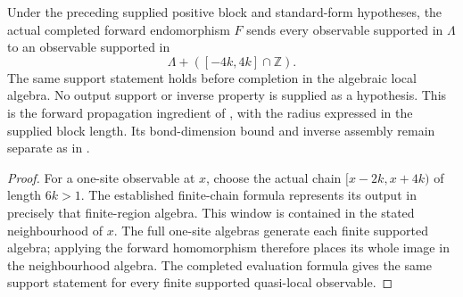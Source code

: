 \begin{lemma}
    \label{lem:mpu_finite_heisenberg_forward_propagation}
    \leanok
    Under the preceding supplied positive block and standard-form
    hypotheses, the actual completed forward endomorphism $F$ sends
    every observable supported in $\Lambda$ to an observable supported
    in
    \[
        \Lambda+([-4k,4k]\cap\mathbb Z).
    \]
    The same support statement holds before completion in the algebraic
    local algebra. No output support or inverse property is supplied
    as a hypothesis. This is the forward propagation ingredient of
    \cite[lines~2298--2306]{Cirac2017MPU}, with the radius expressed
    in the supplied block length. Its bond-dimension bound and inverse
    assembly remain separate as in
    \cite{gap:mpu_qca_complete_block_heisenberg_scope}.
\end{lemma}
\begin{proof}\leanok
    For a one-site observable at $x$, choose the actual chain
    $[x-2k,x+4k)$ of length $6k>1$. The established finite-chain
    formula represents its output in precisely that finite-region
    algebra. This window is contained in the stated neighbourhood
    of $x$. The full one-site algebras generate each finite supported
    algebra; applying the forward homomorphism therefore places
    its whole image in the neighbourhood algebra. The completed
    evaluation formula gives the same support statement for every
    finite supported quasi-local observable.
\end{proof}



